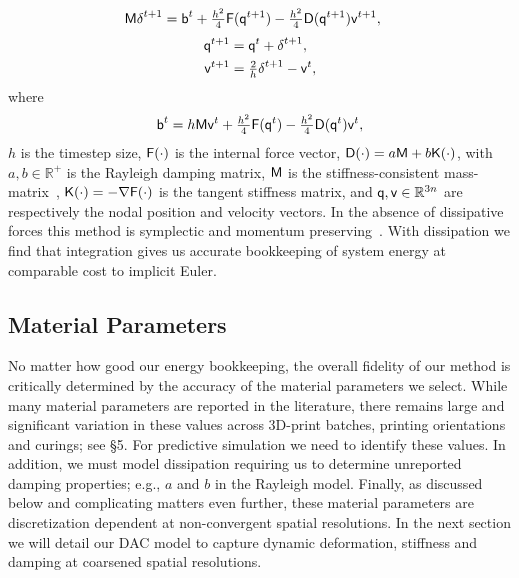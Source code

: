 \begin{align}
\vc M \vc \delta^{t+1} &= \vc b^t +  \tfrac{h^2}{4} \vc F(\vc q^{t+1}) -\tfrac{h^2}{4} \vc D(\vc q^{t+1}) \vc v^{t+1},
\label{eq:newmark_free}
%
\end{align}
\begin{align}
\begin{split}
\mbox{\textbf{{$\mathsf q$}}}^{t+1} &= \mbox{\textbf{{$\mathsf q$}}}^t + \mbox{\textbf{{$\mathsf \delta$}}}^{t+1},\\
\mbox{\textbf{{$\mathsf v$}}}^{t+1} &= \tfrac{2}{h} \mbox{\textbf{{$\mathsf \delta$}}}^{t+1} - \mbox{\textbf{{$\mathsf v$}}}^t,
\end{split}
\label{eq:newmark_free_update}
\end{align}
where
\begin{align}
\mbox{\textbf{{$\mathsf b$}}}^t = h \mbox{\textbf{{$\mathsf M$}}} \mbox{\textbf{{$\mathsf v$}}}^t + \tfrac{h^2}{4} \mbox{\textbf{{$\mathsf F$}}}( \mbox{\textbf{{$\mathsf q$}}}^t) -\tfrac{h^2}{4} \mbox{\textbf{{$\mathsf D$}}}( \mbox{\textbf{{$\mathsf q$}}}^t) \mbox{\textbf{{$\mathsf v$}}}^t,
\label{eq:newmark_predictor}
\end{align}
$h$ is the timestep size, $\mbox{\textbf{{$\mathsf F$}}}(\cdot)$ is the internal force vector, $\mbox{\textbf{{$\mathsf D$}}}(\cdot) = a \mbox{\textbf{{$\mathsf M$}}} + b \mbox{\textbf{{$\mathsf K$}}}(\cdot)$, 
with $a,b \in \mathbb{R}^+$ is the Rayleigh damping matrix, $\mbox{\textbf{{$\mathsf M$}}}$ is the stiffness-consistent mass-matrix~\citep{Belytschko:2013tz},
$\mbox{\textbf{{$\mathsf K$}}}(\cdot) = -\nabla \mbox{\textbf{{$\mathsf F$}}}(\cdot)$ is the tangent stiffness matrix, 
and $\mbox{\textbf{{$\mathsf q$}}}, \mbox{\textbf{{$\mathsf v$}}} \in \mathbb{R}^{3n}$ are respectively the nodal position and velocity vectors. In the absence of dissipative forces this method is symplectic and momentum preserving~\citep{Kane:2000dw}.
With dissipation we find that integration gives us accurate bookkeeping of system energy at comparable cost to implicit Euler. 

\subsection{Material Parameters}
No matter how good our energy bookkeeping, the overall fidelity of our method is critically determined by the accuracy of the material parameters we select. While many material parameters are reported in the literature, there remains large and significant variation in these values across 3D-print batches, printing orientations and curings; see \S5.
For predictive simulation we need to identify these values. In addition, we must model dissipation requiring us to determine unreported damping properties; e.g., $a$ and $b$ in the Rayleigh model. Finally, as discussed below and complicating matters even further, these material parameters are discretization dependent at non-convergent spatial resolutions. In the next section we will detail our DAC model to capture dynamic deformation, stiffness and damping at coarsened spatial resolutions.

